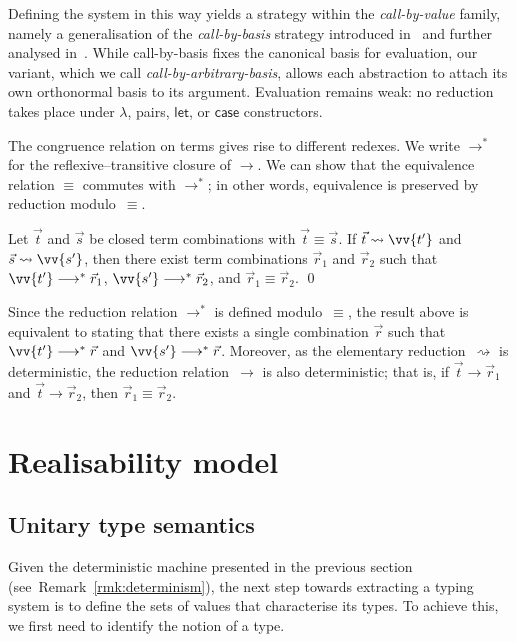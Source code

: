 \documentclass[a4paper,UKenglish,numberwithinsect,pdfa,anonymous]{lipics-v2021}
\theoremstyle{restatestyle}
\newcommand\lra{\longrightarrow}
\def\lraneq{\rightsquigarrow}
\def\eval{\lra^*}
\begin{document}
Defining the system in this way yields a strategy within the
\emph{call-by-value} family, namely a generalisation of the
\emph{call-by-basis} strategy introduced in~\cite{ArrighiDowekLMCS17} and
further analysed in~\cite{AssafDiazcaroPerdrixTassonValironLMCS14}. While
call-by-basis fixes the canonical basis for evaluation, our variant,
which we call \emph{call-by-arbitrary-basis}, allows each abstraction to attach
its own orthonormal basis to its argument. Evaluation remains weak: no
reduction takes place under $\lambda$, pairs, $\mathsf{let}$, or
$\mathsf{case}$ constructors.

The congruence relation on terms gives rise to different redexes. We write
$\eval$ for the reflexive–transitive closure of $\lra$. We can show that the
equivalence relation $\equiv$ commutes with $\eval$; in other words,
equivalence is preserved by reduction modulo~$\equiv$.

\begin{theorem}\label{thm:confluence}
  Let $\vec{t}$ and $\vec{s}$ be closed term combinations with
  $\vec{t}\equiv\vec{s}$. If $\vec{t}\lraneq\vv{t'}$ and $\vec{s}\lraneq\vv{s'}$,
  then there exist term combinations $\vec{r}_{1}$ and $\vec{r}_{2}$ such that
  $\vv{t'}\eval\vec{r}_{1}$, $\vv{s'}\eval\vec{r}_{2}$, and
  $\vec{r}_{1}\equiv\vec{r}_{2}$.
  \qed
\end{theorem}

\begin{remark}\label{rmk:determinism}
  Since the reduction relation $\eval$ is defined modulo~$\equiv$, the result
  above is equivalent to stating that there exists a single combination
  $\vec{r}$ such that $\vv{t'}\eval\vec{r}$ and $\vv{s'}\eval\vec{r}$.
  Moreover, as the elementary reduction~$\lraneq$ is deterministic, the
  reduction relation~$\lra$ is also deterministic; that is, if
  $\vec{t}\lra\vec{r}_{1}$ and $\vec{t}\lra\vec{r}_{2}$, then
  $\vec{r}_{1}\equiv\vec{r}_{2}$.
\end{remark}


\section{Realisability model}\label{sec:model}
\subsection{Unitary type semantics}
Given the deterministic machine presented in the previous section
(see~Remark~\ref{rmk:determinism}), the next
step towards extracting a typing system is to define the sets of values that
characterise its types. To achieve this, we first need to identify the notion
of a type.
\end{document}

